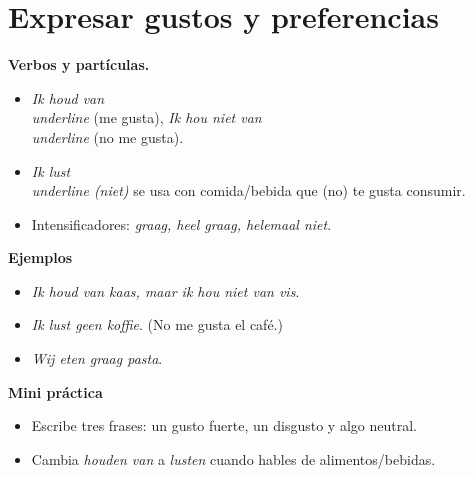 \section{Expresar gustos y preferencias}
\textbf{Verbos y partículas.}
\begin{itemize}[leftmargin=*]
  \item \textit{Ik houd van \\underline{\hspace{1.2cm}}} (me gusta), \textit{Ik hou niet van \\underline{\hspace{1.2cm}}} (no me gusta).
  \item \textit{Ik lust \\underline{\hspace{1.2cm}} (niet)} se usa con comida/bebida que (no) te gusta consumir.
  \item Intensificadores: \textit{graag, heel graag, helemaal niet}.
\end{itemize}

\textbf{Ejemplos}
\begin{itemize}[leftmargin=*]
  \item \textit{Ik houd van kaas, maar ik hou niet van vis}.
  \item \textit{Ik lust geen koffie}. (No me gusta el café.)
  \item \textit{Wij eten graag pasta}.
\end{itemize}

\textbf{Mini práctica}
\begin{itemize}[leftmargin=*]
  \item Escribe tres frases: un gusto fuerte, un disgusto y algo neutral.
  \item Cambia \textit{houden van} a \textit{lusten} cuando hables de alimentos/bebidas.
\end{itemize}
